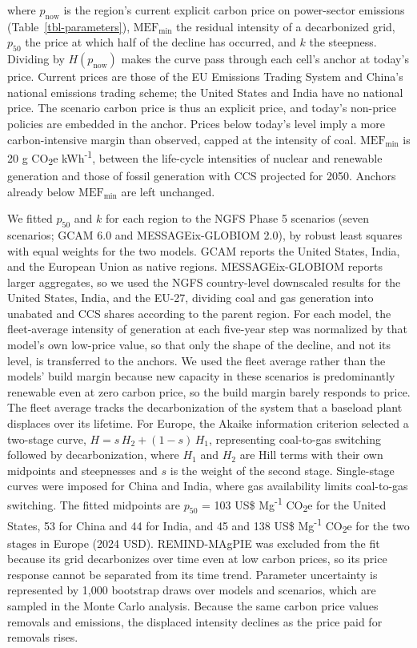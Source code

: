 \documentclass[
  letterpaper,
  twoside,
  twocolumn,
  9pt]{article}
\begin{document}
where \(p_{\mathrm{now}}\) is the region's current explicit carbon price
on power-sector emissions (Table~\ref{tbl-parameters}),
\(\mathrm{MEF}_{\mathrm{min}}\) the residual intensity of a decarbonized
grid, \(p_{50}\) the price at which half of the decline has occurred,
and \(k\) the steepness. Dividing by \(H(p_{\mathrm{now}})\) makes the
curve pass through each cell's anchor at today's price. Current prices
are those of the EU Emissions Trading System and China's national
emissions trading scheme; the United States and India have no national
price. The scenario carbon price is thus an explicit price, and today's
non-price policies are embedded in the anchor. Prices below today's
level imply a more carbon-intensive margin than observed, capped at the
intensity of coal. \(\mathrm{MEF}_{\mathrm{min}}\) is 20 g
CO\textsubscript{2}e kWh\textsuperscript{-1}, between the life-cycle
intensities of nuclear and renewable generation and those of fossil
generation with CCS projected for 2050.\citep{pehl2017} Anchors already
below \(\mathrm{MEF}_{\mathrm{min}}\) are left unchanged.

We fitted \(p_{50}\) and \(k\) for each region to the NGFS Phase 5
scenarios (seven scenarios; GCAM 6.0 and MESSAGEix-GLOBIOM
2.0),\citep{ngfs2026} by robust least squares with equal weights for the
two models. GCAM reports the United States, India, and the European
Union as native regions. MESSAGEix-GLOBIOM reports larger aggregates, so
we used the NGFS country-level downscaled results for the United States,
India, and the EU-27, dividing coal and gas generation into unabated and
CCS shares according to the parent region. For each model, the
fleet-average intensity of generation at each five-year step was
normalized by that model's own low-price value, so that only the shape
of the decline, and not its level, is transferred to the anchors. We
used the fleet average rather than the models' build margin because new
capacity in these scenarios is predominantly renewable even at zero
carbon price, so the build margin barely responds to price. The fleet
average tracks the decarbonization of the system that a baseload plant
displaces over its lifetime. For Europe, the Akaike information
criterion selected a two-stage curve, \(H = s\, H_2 + (1 - s)\, H_1\),
representing coal-to-gas switching followed by decarbonization, where
\(H_1\) and \(H_2\) are Hill terms with their own midpoints and
steepnesses and \(s\) is the weight of the second stage. Single-stage
curves were imposed for China and India, where gas availability limits
coal-to-gas switching. The fitted midpoints are \(p_{50}\) = 103 US\$
Mg\textsuperscript{-1} CO\textsubscript{2}e for the United States, 53
for China and 44 for India, and 45 and 138 US\$ Mg\textsuperscript{-1}
CO\textsubscript{2}e for the two stages in Europe (2024 USD).
REMIND-MAgPIE was excluded from the fit because its grid decarbonizes
over time even at low carbon prices, so its price response cannot be
separated from its time trend. Parameter uncertainty is represented by
1,000 bootstrap draws over models and scenarios, which are sampled in
the Monte Carlo analysis. Because the same carbon price values removals
and emissions, the displaced intensity declines as the price paid for
removals rises.
\end{document}
